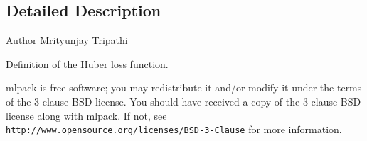\subsection{Detailed Description}
\begin{DoxyAuthor}{Author}
Mrityunjay Tripathi
\end{DoxyAuthor}
Definition of the Huber loss function.

mlpack is free software; you may redistribute it and/or modify it under the terms of the 3-\/clause B\+SD license. You should have received a copy of the 3-\/clause B\+SD license along with mlpack. If not, see {\tt http\+://www.\+opensource.\+org/licenses/\+B\+S\+D-\/3-\/\+Clause} for more information. 